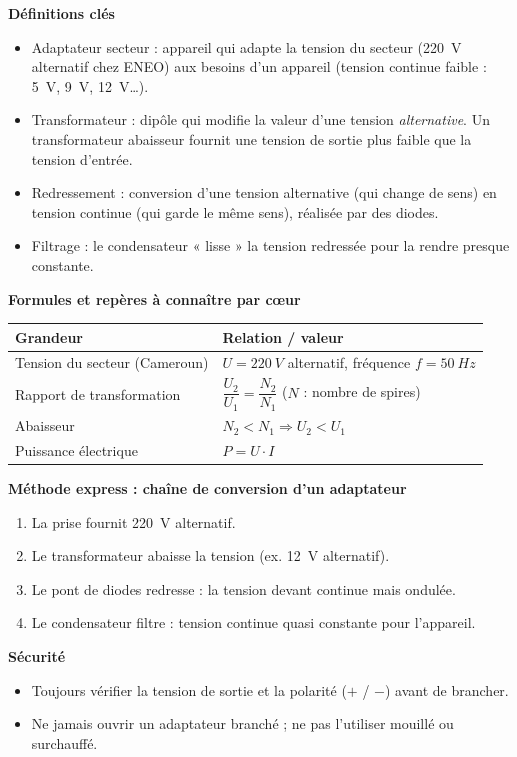 \documentclass[11pt]{article}
\newcommand{\cle}[1]{{\popxbold\color{popdark}#1}}
\begin{document}
\begin{bilan}
\textbf{Définitions clés}
\begin{itemize}
  \item \cle{Adaptateur secteur} : appareil qui adapte la tension du secteur (\SI{220}{V} alternatif chez ENEO) aux besoins d'un appareil (tension continue faible : \SI{5}{V}, \SI{9}{V}, \SI{12}{V}\ldots).
  \item \cle{Transformateur} : dipôle qui modifie la valeur d'une tension \emph{alternative}. Un transformateur \cle{abaisseur} fournit une tension de sortie plus faible que la tension d'entrée.
  \item \cle{Redressement} : conversion d'une tension \cle{alternative} (qui change de sens) en tension \cle{continue} (qui garde le même sens), réalisée par des \cle{diodes}.
  \item \cle{Filtrage} : le condensateur « lisse » la tension redressée pour la rendre presque constante.
\end{itemize}

\textbf{Formules et repères à connaître par c\oe ur}
\begin{center}
\begin{tabularx}{\linewidth}{|l|X|}
\hline
\rowcolor{popblueL} \textbf{Grandeur} & \textbf{Relation / valeur} \\
\hline
Tension du secteur (Cameroun) & $U = \SI{220}{V}$ alternatif, fréquence $f = \SI{50}{Hz}$ \\
\hline
Rapport de transformation & $\dfrac{U_2}{U_1} = \dfrac{N_2}{N_1}$ \quad ($N$ : nombre de spires) \\
\hline
Abaisseur & $N_2 < N_1 \Rightarrow U_2 < U_1$ \\
\hline
Puissance électrique & $P = U \cdot I$ \\
\hline
\end{tabularx}
\end{center}

\textbf{Méthode express : chaîne de conversion d'un adaptateur}
\begin{enumerate}
  \item La prise fournit \SI{220}{V} alternatif.
  \item Le \cle{transformateur} abaisse la tension (ex. \SI{12}{V} alternatif).
  \item Le \cle{pont de diodes} redresse : la tension devant continue mais ondulée.
  \item Le \cle{condensateur} filtre : tension continue quasi constante pour l'appareil.
\end{enumerate}

\textbf{Sécurité}
\begin{itemize}
  \item Toujours vérifier la tension de sortie et la \cle{polarité} ($+$ / $-$) avant de brancher.
  \item Ne jamais ouvrir un adaptateur branché ; ne pas l'utiliser mouillé ou surchauffé.
\end{itemize}
\end{bilan}
\end{document}
